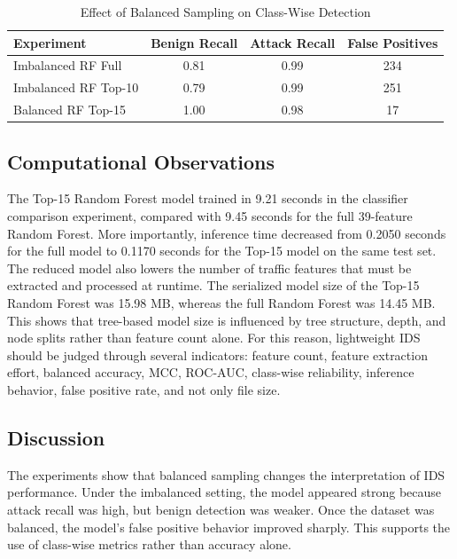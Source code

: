 \documentclass[journal]{IEEEtran}
\begin{document}
\begin{table}[htbp]
\caption{Effect of Balanced Sampling on Class-Wise Detection}
\label{tab:imbalance_effect}
\centering
\begin{tabular}{|l|c|c|c|}
\hline
\textbf{Experiment} & \textbf{Benign Recall} & \textbf{Attack Recall} & \textbf{False Positives} \\
\hline
Imbalanced RF Full & 0.81 & 0.99 & 234 \\
Imbalanced RF Top-10 & 0.79 & 0.99 & 251 \\
Balanced RF Top-15 & 1.00 & 0.98 & 17 \\
\hline
\end{tabular}
\end{table}

\subsection{Computational Observations}

The Top-15 Random Forest model trained in 9.21 seconds in the classifier comparison experiment, compared with 9.45 seconds for the full 39-feature Random Forest. More importantly, inference time decreased from 0.2050 seconds for the full model to 0.1170 seconds for the Top-15 model on the same test set. The reduced model also lowers the number of traffic features that must be extracted and processed at runtime. The serialized model size of the Top-15 Random Forest was 15.98 MB, whereas the full Random Forest was 14.45 MB. This shows that tree-based model size is influenced by tree structure, depth, and node splits rather than feature count alone. For this reason, lightweight IDS should be judged through several indicators: feature count, feature extraction effort, balanced accuracy, MCC, ROC-AUC, class-wise reliability, inference behavior, false positive rate, and not only file size.

\subsection{Discussion}

The experiments show that balanced sampling changes the interpretation of IDS performance. Under the imbalanced setting, the model appeared strong because attack recall was high, but benign detection was weaker. Once the dataset was balanced, the model's false positive behavior improved sharply. This supports the use of class-wise metrics rather than accuracy alone.
\end{document}

